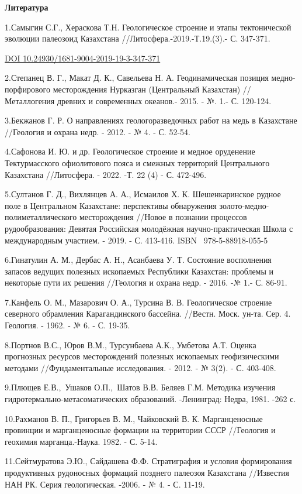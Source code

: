 {\bfseries Литература}

1.Самыгин С.Г., Хераскова Т.Н. Геологическое строение и этапы
тектонической эволюции палеозоид Казахстана
//Литосфера.-2019.-Т.19.(3).- С. 347-371.

\href{https://doi.org/10.24930/1681-9004-2019-19-3-347-371}{DOI
10.24930/1681-9004-2019-19-3-347-371}

2.Степанец В. Г., Макат Д. К., Савельева Н. А. Геодинамическая позиция
медно-порфирового месторождения Нурказган (Центральный Казахстан)
//Металлогения древних и современных океанов.- 2015. - №. 1.- С.
120-124.

3.Бекжанов Г. Р. О направлениях геологоразведочных работ на медь в
Казахстане //Геология и охрана недр. - 2012. - № 4. - С. 52-54.

4.Сафонова И. Ю. и др. Геологическое строение и медное оруденение
Тектурмасского офиолитового пояса и смежных территорий Центрального
Казахстана //Литосфера. - 2022. -Т. 22 (4) - С. 472-496.

5.Султанов Г. Д., Вихлянцев А. А., Исмаилов Х. К. Шешенкаринское рудное
поле в Центральном Казахстане: перспективы обнаружения
золото-медно-полиметаллического месторождения //Новое в познании
процессов рудообразования: Девятая Российская молодёжная
научно-практическая Школа с международным участием. - 2019. - С.
413-416. ISBN ~978-5-88918-055-5

6.Гинатулин А. М., Дербас А. Н., Асанбаева У. Т. Состояние восполнения
запасов ведущих полезных ископаемых Республики Казахстан: проблемы и
некоторые пути их решения //Геология и охрана недр. - 2016. -№ 1.- С.
86-91.

7.Канфель О. М., Мазарович О. А., Турсина В. В. Геологическое строение
северного обрамления Карагандинского бассейна. //Вестн. Моск. ун-та.
Сер. 4. Геология. - 1962. - № 6. - С. 19-35.

8.Портнов В.С., Юров В.М., Турсунбаева А.К., Умбетова А.Т. Оценка
прогнозных ресурсов месторождений полезных ископаемых геофизическими
методами //Фундаментальные исследования. - 2012. - № 3(2). - С. 403-408.

9.Плющев Е.В.,~Ушаков О.П.,~Шатов В.В. Беляев Г.М. Методика изучения
гидротермально-метасоматических образований. -Ленинград: Недра, 1981.
-262 с.

10.Рахманов В. П., Григорьев В. М., Чайковский В. К. Марганценосные
провинции и марганценосные формации на территории СССР //Геология и
геохимия марганца.-Наука. 1982. - С. 5-14.

11.Сейтмуратова Э.Ю., Сайдашева Ф.Ф. Стратиграфия и условия формирования
продуктивных рудоносных формаций позднего палеозоя Казахстана //Известия
НАН РК. Серия геологическая. -2006. - № 4. - С. 11-19.

